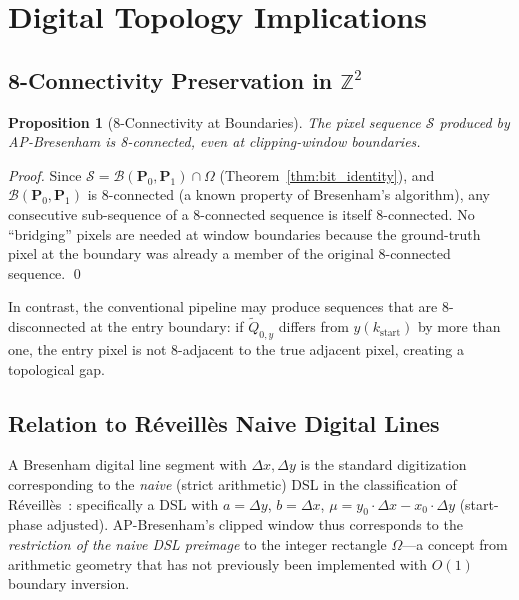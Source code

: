 \documentclass[12pt,a4paper]{article}
\newtheorem{proposition}[theorem]{Proposition}
\theoremstyle{definition}
\newcommand{\Zt}{\mathbb{Z}^2}
\newcommand{\Bresen}{\mathcal{B}}
\newcommand{\dx}{\Delta x}
\newcommand{\dy}{\Delta y}
\newcommand{\kst}{k_{\mathrm{start}}}
\begin{document}
\section{Digital Topology Implications}
\label{sec:topology}

\subsection{8-Connectivity Preservation in $\Zt$}

\begin{proposition}[8-Connectivity at Boundaries]
\label{prop:8conn}
The pixel sequence $\mathcal{S}$ produced by AP-Bresenham
is 8-connected, even at clipping-window boundaries.
\end{proposition}

\begin{proof}
Since $\mathcal{S} = \Bresen(\mathbf{P}_0,\mathbf{P}_1)
\cap \Omega$ (Theorem~\ref{thm:bit_identity}), and
$\Bresen(\mathbf{P}_0,\mathbf{P}_1)$ is 8-connected (a
known property of Bresenham's algorithm), any consecutive
sub-sequence of a 8-connected sequence is itself
8-connected. No ``bridging'' pixels are needed at window
boundaries because the ground-truth pixel at the boundary
was already a member of the original 8-connected sequence.
\qed
\end{proof}

In contrast, the conventional pipeline may produce sequences
that are 8-disconnected at the entry boundary: if
$\tilde{Q}_{0,y}$ differs from $y(\kst)$ by more than one,
the entry pixel is not 8-adjacent to the true adjacent
pixel, creating a topological gap.

\subsection{Relation to R{\'e}veill{\`e}s Naive Digital Lines}

A Bresenham digital line segment with $\dx, \dy$ is the
standard digitization corresponding to the \emph{naive}
(strict arithmetic) DSL in the classification of
R{\'e}veill{\`e}s~\cite{reveilles1991geometrie}:
specifically a DSL with $a = \dy$, $b = \dx$,
$\mu = y_0 \cdot \dx - x_0 \cdot \dy$ (start-phase
adjusted). AP-Bresenham's clipped window thus corresponds
to the \emph{restriction of the naive DSL preimage} to
the integer rectangle $\Omega$---a concept from arithmetic
geometry that has not previously been implemented with
$O(1)$ boundary inversion.
\end{document}
